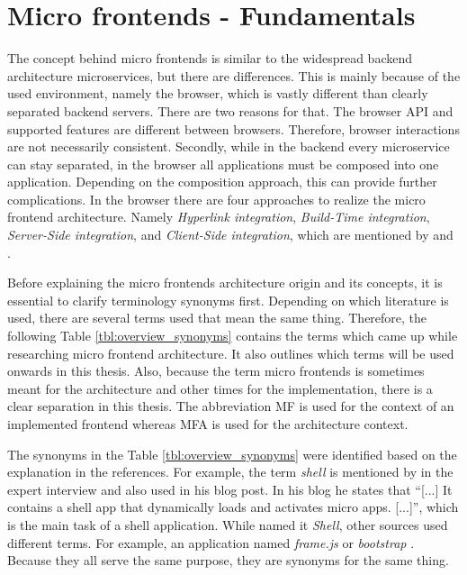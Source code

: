 
\chapter{Micro frontends - Fundamentals}\label{cha:Theory}

The concept behind micro frontends is similar to the widespread backend architecture microservices, but there are differences.
This is mainly because of the used environment, namely the browser, which is vastly different than clearly separated backend servers.
There are two reasons for that.
The browser \ac{API} and supported features are different between browsers.
Therefore, browser interactions are not necessarily consistent.
Secondly, while in the backend every microservice can stay separated, in the browser all applications must be composed into one application.
Depending on the composition approach, this can provide further complications.
In the browser there are four approaches to realize the micro frontend architecture.
Namely \textit{Hyperlink integration}, \textit{Build-Time integration}, \textit{Server-Side integration}, and \textit{Client-Side integration}, which are mentioned by \textcite[p.~69ff.]{Wenzel.2020} and \textcite{Leitner.2020}. %

Before explaining the micro frontends architecture origin and its concepts, it is essential to clarify terminology synonyms first.
Depending on which literature is used, there are several terms used that mean the same thing.
Therefore, the following Table \ref{tbl:overview_synonyms} contains the terms which came up while researching micro frontend architecture.
It also outlines which terms will be used onwards in this thesis.
Also, because the term micro frontends is sometimes meant for the architecture and other times for the implementation, there is a clear separation in this thesis.
The abbreviation \ac{MF} is used for the context of an implemented frontend whereas \ac{MFA} is used for the architecture context.

The synonyms in the Table \ref{tbl:overview_synonyms} were identified based on the explanation in the references.
For example, the term \textit{shell} is mentioned by \textciteSteyer{} in the expert interview and also used in his blog post\footnotemark{}.
In his blog he states that \enquote{[...] It contains a shell app that dynamically loads and activates micro apps. [...]}, which is the main task of a shell application.
While \citeauthorSteyer{} named it \textit{Shell}, other sources used different terms.
For example, an application named \textit{frame.js} \cite{Laug.2018} or \textit{bootstrap} \cite{Vogel.2020.Mezzalira}.
Because they all serve the same purpose, they are synonyms for the same thing.

